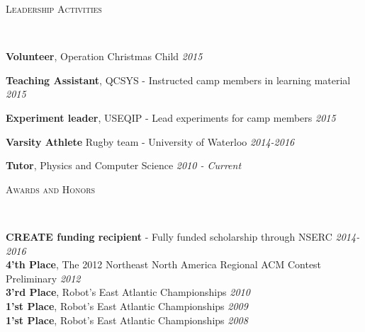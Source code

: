 \documentclass[9pt]{article}
\newenvironment{changemargin}[2]{%
  \begin{list}{}{%
    \setlength{\topsep}{0pt}%
    \setlength{\leftmargin}{#1}%
    \setlength{\rightmargin}{#2}%
    \setlength{\listparindent}{\parindent}%
    \setlength{\itemindent}{\parindent}%
    \setlength{\parsep}{\parskip}%
  }%
  \item[]}{\end{list}
}
\newcommand{\lineover}{
	\begin{changemargin}{-0.05in}{-0.05in}
		\vspace*{-8pt}
		\hrulefill \\
		\vspace*{-2pt}
	\end{changemargin}
}
\newcommand{\header}[1]{
	\begin{changemargin}{-0.5in}{-0.5in}
		\scshape{#1}\\
  	\lineover
	\end{changemargin}
}
\newenvironment{body} {
	\vspace*{-16pt}
	\begin{changemargin}{-0.25in}{-0.5in}
  }	
	{\end{changemargin}
}
\begin{document}
\smallskip


\header{Leadership Activities}

\begin{body}
	\vspace{14pt}
	
	\textbf{Volunteer}, Operation Christmas Child \hfill{} \emph{2015}\\
\end{body}

\begin{body}
	\vspace{14pt}
	
	\textbf{Teaching Assistant}, QCSYS - Instructed camp members in learning material \hfill{} \emph{2015}\\
\end{body}
\begin{body}
	\vspace{14pt}
	
	\textbf{Experiment leader}, USEQIP - Lead experiments for camp members \hfill{} \emph{2015}\\
\end{body}

\begin{body}
	\vspace{14pt}
	
	\textbf{Varsity Athlete} Rugby team - University of Waterloo \hfill{} \emph{2014-2016}\\
\end{body}
\begin{body}
	\vspace{14pt}

	\textbf{Tutor}, Physics and Computer Science \hfill{} \emph{2010 - Current}\\
\end{body}

\smallskip


\header{Awards and Honors}

\begin{body}
	\vspace{14pt}
	\textbf{CREATE funding recipient} - Fully funded scholarship through NSERC \hfill{} \emph{2014-2016}\\
	\smallskip
	\textbf{4'th Place}, The 2012 Northeast North America Regional ACM Contest Preliminary \hfill{} \emph{2012}\\
	\smallskip
	\textbf{3'rd Place}, Robot's East Atlantic Championships \hfill{} \emph {2010}
	\\
	\smallskip
	\textbf{1'st Place}, Robot's East Atlantic Championships \hfill{} \emph {2009}
	\\
	\smallskip
	\textbf{1'st Place}, Robot's East Atlantic Championships \hfill{} \emph {2008}
\end{body}
\end{document}

